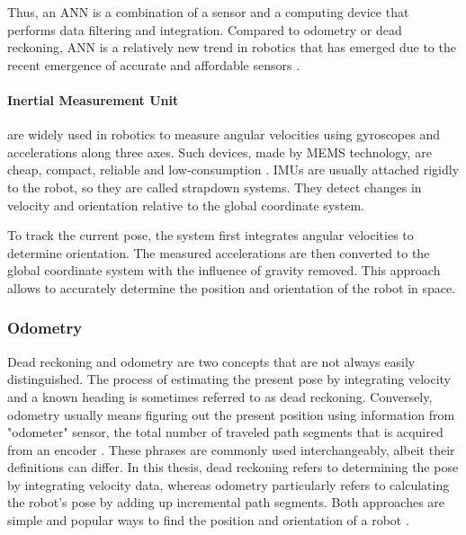 Thus, an ANN is a combination of a sensor and a computing device that performs data filtering and integration. Compared to odometry or dead reckoning, ANN is a relatively new trend in robotics that has emerged due to the recent emergence of accurate and affordable sensors \citep{Borenstein1996WhereAI}.

\paragraph{Inertial Measurement Unit} are widely used in robotics to measure angular velocities using gyroscopes and accelerations along three axes. Such devices, made by MEMS technology, are cheap, compact, reliable and low-consumption \citep{biezad1999integrated}. IMUs are usually attached rigidly to the robot, so they are called strapdown systems. They detect changes in velocity and orientation relative to the global coordinate system\citep{biezad1999integrated}.

To track the current pose, the system first integrates angular velocities to determine orientation. The measured accelerations are then converted to the global coordinate system with the influence of gravity removed. This approach allows to accurately determine the position and orientation of the robot in space.


\subsubsection{Odometry}
Dead reckoning and odometry are two concepts that are not always easily distinguished. The process of estimating the present pose by integrating velocity and a known heading is sometimes referred to as dead reckoning. Conversely, odometry usually means figuring out the present position using information from "odometer" sensor, the total number of traveled path segments that is acquired from an encoder \citep{Borenstein1996WhereAI}. These phrases are commonly used interchangeably, albeit their definitions can differ. In this thesis, dead reckoning refers to determining the pose by integrating velocity data, whereas odometry particularly refers to calculating the robot's pose by adding up incremental path segments. Both approaches are simple and popular ways to find the position and orientation of a robot \citep{Scaramuzza2011}.

